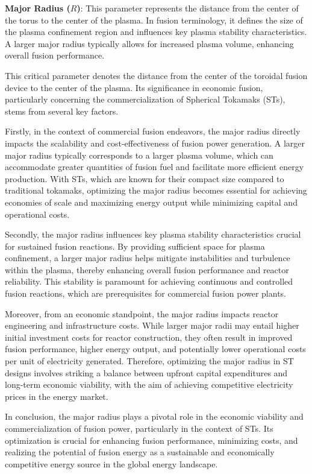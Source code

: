 \documentclass[journal]{IEEEtran}
\begin{document}
\textbf{Major Radius ($R$)}: This parameter represents the distance from the center of the torus to the center of the plasma. In fusion terminology, it defines the size of the plasma confinement region and influences key plasma stability characteristics. A larger major radius typically allows for increased plasma volume, enhancing overall fusion performance.

This critical parameter denotes the distance from the center of the toroidal fusion device to the center of the plasma. Its significance in economic fusion, particularly concerning the commercialization of Spherical Tokamaks (STs), stems from several key factors.

Firstly, in the context of commercial fusion endeavors, the major radius directly impacts the scalability and cost-effectiveness of fusion power generation. A larger major radius typically corresponds to a larger plasma volume, which can accommodate greater quantities of fusion fuel and facilitate more efficient energy production. With STs, which are known for their compact size compared to traditional tokamaks, optimizing the major radius becomes essential for achieving economies of scale and maximizing energy output while minimizing capital and operational costs.

Secondly, the major radius influences key plasma stability characteristics crucial for sustained fusion reactions. By providing sufficient space for plasma confinement, a larger major radius helps mitigate instabilities and turbulence within the plasma, thereby enhancing overall fusion performance and reactor reliability. This stability is paramount for achieving continuous and controlled fusion reactions, which are prerequisites for commercial fusion power plants.

Moreover, from an economic standpoint, the major radius impacts reactor engineering and infrastructure costs. While larger major radii may entail higher initial investment costs for reactor construction, they often result in improved fusion performance, higher energy output, and potentially lower operational costs per unit of electricity generated. Therefore, optimizing the major radius in ST designs involves striking a balance between upfront capital expenditures and long-term economic viability, with the aim of achieving competitive electricity prices in the energy market.

In conclusion, the major radius plays a pivotal role in the economic viability and commercialization of fusion power, particularly in the context of STs. Its optimization is crucial for enhancing fusion performance, minimizing costs, and realizing the potential of fusion energy as a sustainable and economically competitive energy source in the global energy landscape.
\end{document}

